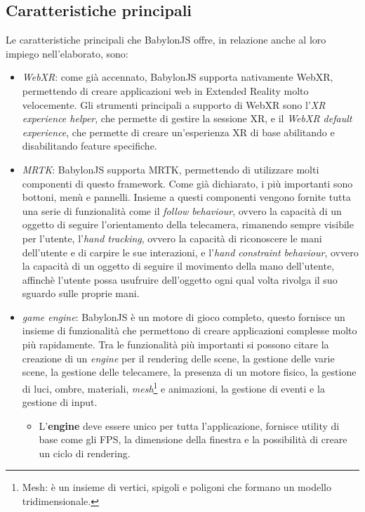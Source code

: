 \subsection{Caratteristiche principali}\label{subsec:BabylonJS_caratteristiche}
Le caratteristiche principali che BabylonJS offre, in relazione anche al loro impiego nell'elaborato, sono:
\begin{itemize}
    \item \textit{WebXR}: come già accennato, BabylonJS supporta nativamente WebXR, permettendo di creare applicazioni web in Extended Reality molto velocemente. Gli strumenti principali
    a supporto di WebXR sono l'\textit{XR experience helper}, che permette di gestire la sessione XR, e il \textit{WebXR default experience}, che permette di creare un'esperienza
    XR di base abilitando e disabilitando feature specifiche.
    \item \textit{MRTK}: BabylonJS supporta MRTK, permettendo di utilizzare molti componenti di questo framework. Come già dichiarato, i più importanti sono
    bottoni, menù e pannelli. Insieme a questi componenti vengono fornite tutta una serie di funzionalità come il \textit{follow behaviour}, ovvero la capacità di un oggetto di 
    seguire l'orientamento della telecamera, rimanendo sempre visibile per l'utente, l'\textit{hand tracking}, ovvero la capacità di riconoscere le mani dell'utente e di 
    carpire le sue interazioni, e l'\textit{hand constraint behaviour}, ovvero la capacità di un oggetto di seguire il movimento della mano dell'utente, affinchè l'utente possa
    usufruire dell'oggetto ogni qual volta rivolga il suo sguardo sulle proprie mani.
    \item \textit{game engine}: BabylonJS è un motore di gioco completo, questo fornisce un insieme di funzionalità che permettono di creare applicazioni complesse molto più rapidamente.
    Tra le funzionalità più importanti si possono citare la creazione di un \textit{engine} per il rendering delle scene, la gestione delle varie scene, la gestione delle telecamere,
    la presenza di un motore fisico, la gestione di luci, ombre, materiali, \textit{mesh}\footnote{Mesh: è un insieme di vertici, spigoli e poligoni che formano un modello tridimensionale.}
    e animazioni, la gestione di eventi e la gestione di input.
    \begin{itemize}
        \item L'\textbf{engine} deve essere unico per tutta l'applicazione, fornisce utility di base come gli FPS, la dimensione della finestra e la possibilità di creare un ciclo di rendering.

\end{itemize}
\end{itemize}
